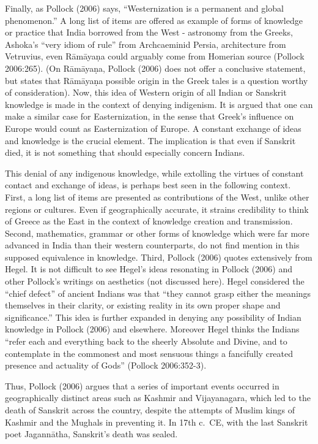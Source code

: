 Finally, as Pollock (2006) says, “Westernization is a permanent and global phenomenon.” A long list of items are offered as example of forms of knowledge or practice that India borrowed from the West - astronomy from the Greeks, Ashoka’s “very idiom of rule” from  Archcaeminid Persia, architecture from Vetruvius, even Rāmāyaṇa could arguably come from Homerian source (Pollock 2006:265). (On  Rāmāyaṇa, Pollock (2006) does not offer a conclusive statement, but states that Rāmāyaṇa possible origin in the Greek tales is a question worthy of consideration). Now, this idea of Western origin of all Indian or Sanskrit knowledge is made in the context of denying indigenism. It is argued that one can make a similar case for Easternization, in the sense that Greek’s influence on Europe would count as Easternization of Europe. A constant exchange of ideas and knowledge is the crucial element. The implication is that even if Sanskrit died, it is not something that should especially concern Indians.

This denial of any indigenous knowledge, while extolling the virtues of constant contact and exchange of ideas, is perhaps best seen in the following context. First, a long list of items are presented as contributions of the West, unlike other regions or cultures. Even if geographically accurate, it strains credibility to think of Greece as the East in the context of knowledge creation and transmission. Second, mathematics, grammar or other forms of knowledge which were far more advanced in India than their western counterparts, do not find mention in this supposed equivalence in knowledge. Third, Pollock (2006) quotes extensively from Hegel. It is not difficult to see Hegel’s ideas resonating in Pollock (2006) and other Pollock’s writings on aesthetics (not discussed here). Hegel considered the “chief defect” of ancient Indians was that “they cannot grasp either the meanings themselves in their clarity, or existing reality in its own proper shape and significance.” This idea is further expanded in denying any possibility of Indian knowledge in Pollock (2006) and elsewhere. Moreover Hegel thinks the Indians “refer each and everything back to the sheerly Absolute and Divine, and to contemplate in the commonest and most sensuous things a fancifully created presence and actuality of Gods” (Pollock 2006:352-3).

Thus, Pollock (2006) argues that a series of important events occurred in geographically distinct areas such as Kashmir and Vijayanagara, which led to the death of Sanskrit across the country, despite the attempts of Muslim kings of Kashmir and the Mughals in preventing it. In 17th c.\ CE, with the last Sanskrit poet Jagannātha, Sanskrit’s death was sealed.

